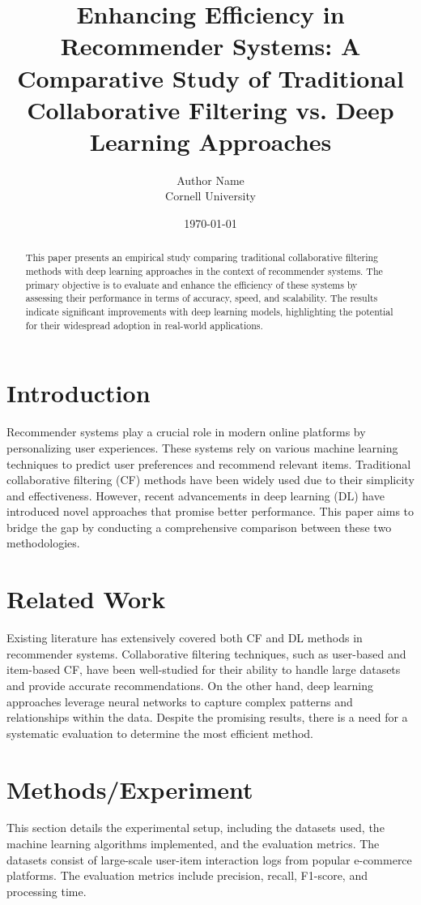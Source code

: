 \documentclass{article}
\title{Enhancing Efficiency in Recommender Systems: A Comparative Study of Traditional Collaborative Filtering vs. Deep Learning Approaches}
\author{Author Name \\ \small Cornell University}
\date{\today}
\begin{document}
\maketitle

\begin{abstract}
This paper presents an empirical study comparing traditional collaborative filtering methods with deep learning approaches in the context of recommender systems. The primary objective is to evaluate and enhance the efficiency of these systems by assessing their performance in terms of accuracy, speed, and scalability. The results indicate significant improvements with deep learning models, highlighting the potential for their widespread adoption in real-world applications.
\end{abstract}

\section{Introduction}
Recommender systems play a crucial role in modern online platforms by personalizing user experiences. These systems rely on various machine learning techniques to predict user preferences and recommend relevant items. Traditional collaborative filtering (CF) methods have been widely used due to their simplicity and effectiveness. However, recent advancements in deep learning (DL) have introduced novel approaches that promise better performance. This paper aims to bridge the gap by conducting a comprehensive comparison between these two methodologies.

\section{Related Work}
Existing literature has extensively covered both CF and DL methods in recommender systems. Collaborative filtering techniques, such as user-based and item-based CF, have been well-studied for their ability to handle large datasets and provide accurate recommendations. On the other hand, deep learning approaches leverage neural networks to capture complex patterns and relationships within the data. Despite the promising results, there is a need for a systematic evaluation to determine the most efficient method.

\section{Methods/Experiment}
This section details the experimental setup, including the datasets used, the machine learning algorithms implemented, and the evaluation metrics. The datasets consist of large-scale user-item interaction logs from popular e-commerce platforms. The evaluation metrics include precision, recall, F1-score, and processing time.
\end{document}
